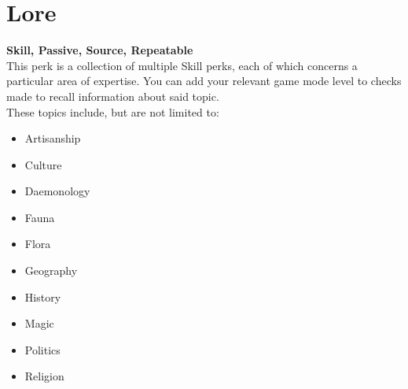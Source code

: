 \section{Lore}\label{sec:lore}
\textbf{Skill, Passive, Source, Repeatable}\\
This perk is a collection of multiple Skill perks, each of which concerns a particular area of expertise.
You can add your relevant game mode level to checks made to recall information about said topic.\\
These topics include, but are not limited to:\\

\begin{itemize}
    \item Artisanship
    \item Culture
    \item Daemonology
    \item Fauna
    \item Flora
    \item Geography
    \item History
    \item Magic
    \item Politics
    \item Religion
\end{itemize}